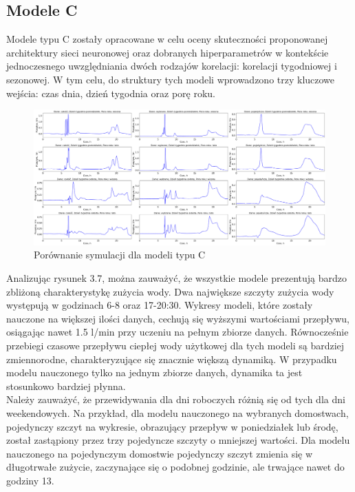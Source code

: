 \documentclass[a4paper,twoside,12pt]{book}
\begin{document}
\subsection*{Modele C}
Modele typu C zostały opracowane w celu oceny skuteczności proponowanej architektury sieci neuronowej oraz dobranych hiperparametrów w kontekście jednoczesnego uwzględniania dwóch rodzajów korelacji: korelacji tygodniowej i sezonowej. W tym celu, do struktury tych modeli wprowadzono trzy kluczowe wejścia: czas dnia, dzień tygodnia oraz porę roku.
\begin{figure}[!h]
  \centering
  \includegraphics[width=1\textwidth]{img/Model_C.png}
  \caption{Porównanie symulacji dla modeli typu C}
  \label{fig:etykieta-rysunku}
\end{figure}

Analizując rysunek 3.7, można zauważyć, że wszystkie modele prezentują bardzo zbliżoną charakterystykę zużycia wody. Dwa największe szczyty zużycia wody występują w godzinach 6-8 oraz 17-20:30. Wykresy modeli, które zostały nauczone na większej ilości danych, cechują się wyższymi wartościami przepływu, osiągając nawet 1.5 l/min przy uczeniu na pełnym zbiorze danych. Równocześnie przebiegi czasowe przepływu ciepłej wody użytkowej dla tych modeli są bardziej zmiennorodne, charakteryzujące się znacznie większą dynamiką. W przypadku modelu nauczonego tylko na jednym zbiorze danych, dynamika ta jest stosunkowo bardziej płynna.\\

Należy zauważyć, że przewidywania dla dni roboczych różnią się od tych dla dni weekendowych. Na przykład, dla modelu nauczonego na wybranych domostwach, pojedynczy szczyt na wykresie, obrazujący przepływ w poniedziałek lub środę, został zastąpiony przez trzy pojedyncze szczyty o mniejszej wartości. Dla modelu nauczonego na pojedynczym domostwie pojedynczy szczyt zmienia się w długotrwałe zużycie, zaczynające się o podobnej godzinie, ale trwające nawet do godziny 13.
\end{document}
